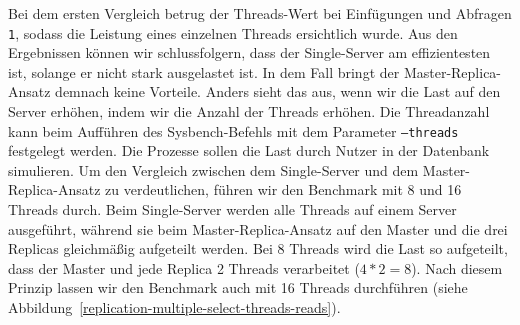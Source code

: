 Bei dem ersten Vergleich betrug der Threads-Wert bei Einfügungen und Abfragen \texttt{1}, sodass die Leistung eines einzelnen Threads ersichtlich wurde.
Aus den Ergebnissen können wir schlussfolgern, dass der Single-Server am effizientesten ist, solange er nicht stark ausgelastet ist.
In dem Fall bringt der Master-Replica-Ansatz demnach keine Vorteile.
Anders sieht das aus, wenn wir die Last auf den Server erhöhen, indem wir die Anzahl der Threads erhöhen.
Die Threadanzahl kann beim Aufführen des Sysbench-Befehls mit dem Parameter \texttt{--threads} festgelegt werden.
Die Prozesse sollen die Last durch Nutzer in der Datenbank simulieren.
Um den Vergleich zwischen dem Single-Server und dem Master-Replica-Ansatz zu verdeutlichen, führen wir den Benchmark mit 8 und 16 Threads durch.
Beim Single-Server werden alle Threads auf einem Server ausgeführt, während sie beim Master-Replica-Ansatz auf den Master und die drei Replicas gleichmäßig aufgeteilt werden.
Bei 8 Threads wird die Last so aufgeteilt, dass der Master und jede Replica 2 Threads verarbeitet ($4 * 2 = 8$).
Nach diesem Prinzip lassen wir den Benchmark auch mit 16 Threads durchführen (siehe Abbildung~\ref{replication-multiple-select-threads-reads}).

